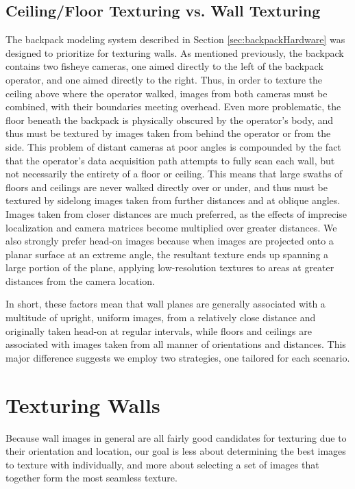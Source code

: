 \documentclass[10pt,twocolumn,letterpaper]{article}
\begin{document}
\subsection{Ceiling/Floor Texturing vs. Wall Texturing}
\label{sec:whydifferent}
The backpack
modeling system described in Section \ref{sec:backpackHardware} was designed to prioritize for
texturing walls. As mentioned previously, the backpack contains two
fisheye cameras, one aimed directly to the left of the backpack
operator, and one aimed directly to the right. Thus, in order to
texture the ceiling above where the operator walked, images from both
cameras must be combined, with their boundaries meeting overhead. Even more problematic, the floor beneath the
backpack is physically obscured by the operator's body, and thus must
be textured by images taken from behind the operator or from the side. This problem of distant cameras at poor angles
is compounded by the fact that the operator's data acquisition path
attempts to fully scan each wall, but not necessarily the entirety of
a floor or ceiling. This means that large swaths of floors and
ceilings are never walked directly over or under, and thus must be
textured by sidelong images taken from further distances and at
oblique angles. Images taken from closer distances are much preferred, as the effects of imprecise localization and camera matrices become multiplied over greater distances. We also strongly prefer head-on images because when images
are projected onto a planar surface at an extreme angle, the resultant
texture ends up spanning a large portion of the plane, applying
low-resolution textures to areas at greater distances from the camera
location.

In short, these factors mean that wall planes are generally associated with a
multitude of upright, uniform images, from a relatively close distance and originally taken head-on at regular intervals, while floors and
ceilings are associated with images taken from all manner of orientations and
distances. This major difference suggests we employ two strategies,
one tailored for each scenario.


\section{Texturing Walls}
Because wall images in general are all fairly good candidates for texturing due to their orientation and location, our goal is less about determining the best images to texture with individually, and more about selecting a set of images that together form the most seamless texture.
\end{document}
